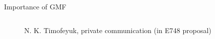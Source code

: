 \documentclass[aspectratio=43, dvipsnames]{beamer}
\newcommand{\iso}[2]{\ce{^{#1}#2}}
\begin{document}
\begin{frame}[t]{Importance of GMF}
\begin{columns}[T]
{\begin{figure}
                \caption{N. K. Timofeyuk, private communication (in E748 proposal)}
            \end{figure}
        }
    \end{columns}
    \begin{columns}[c]
        \begin{column}{0.78\linewidth}
        \end{column}
    \end{columns}
\end{frame}
\end{document}
